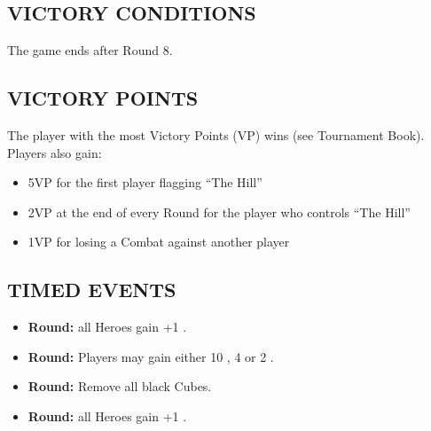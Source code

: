 \begin{multicols*}{2}
\subsection*{\MakeUppercase{Victory Conditions}}
The game ends after Round 8.

\subsection*{\MakeUppercase{Victory Points}}
The player with the most Victory Points (VP) wins (see Tournament Book). Players also gain:
\begin{itemize}
  \item 5VP for the first player flagging ``The Hill''
  \item 2VP at the end of every Round for the player who controls ``The Hill''
  \item 1VP for losing a Combat against another player
\end{itemize}

\subsection*{\MakeUppercase{Timed Events}}

\begin{itemize}
  \item \textbf{ Round:} all Heroes gain +1 .
  \item \textbf{ Round:} Players may gain either 10 , 4  or 2 .
  \item \textbf{ Round:} Remove all black Cubes.
  \item \textbf{ Round:} all Heroes gain +1 .
\end{itemize}


\end{multicols*}
